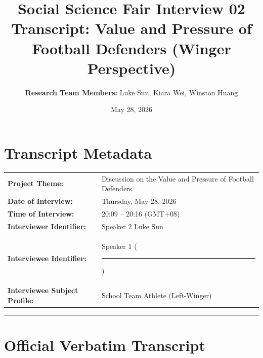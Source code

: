 \documentclass[11pt,a4paper]{article}
\title{\textbf{Social Science Fair Interview 02 \\ Transcript: Value and Pressure of Football Defenders (Winger Perspective)}}
\author{\textbf{Research Team Members:} Luke Sun, Kiara Wei, Winston Huang}
\date{May 28, 2026}
\newcommand{\redacted}{\rule{2.5cm}{2ex}}
\begin{document}
\maketitle

\section*{Transcript Metadata}
\begin{tabular}{ll}
    \textbf{Project Theme:} & Discussion on the Value and Pressure of Football Defenders \\
    \textbf{Date of Interview:} & Thursday, May 28, 2026 \\
    \textbf{Time of Interview:} & 20:09 -- 20:16 (GMT+08) \\
    \textbf{Interviewer Identifier:} & Speaker 2 Luke Sun\\
    \textbf{Interviewee Identifier:} & Speaker 1 (\redacted) \\
    \textbf{Interviewee Subject Profile:} & School Team Athlete (Left-Winger)
\end{tabular}

\vspace{2em}
\hrule
\vspace{1.5em}

\section*{Official Verbatim Transcript}
\end{document}
